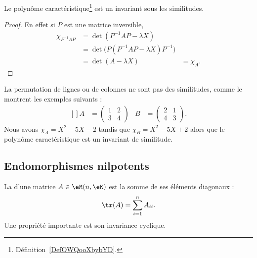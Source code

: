 \begin{lemma}
Le polynôme caractéristique\footnote{Définition~\ref{DefOWQooXbybYD}.} est un invariant sous les similitudes. 
\end{lemma}

\begin{proof}
En effet si \( P\) est une matrice inversible,
\begin{subequations}
    \begin{align}
        \chi_{P^{-1}AP} & = \det(P^{-1}AP-\lambda X)                     \\
                        & = \det\big( P(P^{-1}AP-\lambda X)P^{-1} \big)  \\
                        & = \det(A-\lambda X)
                        & = \chi_A.
    \end{align}
\end{subequations}
\end{proof}

La permutation de lignes ou de colonnes ne sont pas des similitudes, comme le montrent les exemples suivants :
\begin{equation}
    \begin{aligned}[]
        A&=\begin{pmatrix}
            1    &   2    \\
            3    &   4
        \end{pmatrix}&
        B&=\begin{pmatrix}
            2    &   1    \\
            4    &   3
        \end{pmatrix}.
    \end{aligned}
\end{equation}
Nous avons \( \chi_A=X^2-5X-2\) tandis que \( \chi_B=X^2-5X+2\) alors que le polynôme caractéristique est un invariant de similitude.

\subsection{Endomorphismes nilpotents}

La  d'une matrice \( A\in \eM(n,\eK)\) est la somme de ses éléments diagonaux :
\begin{equation}
    \tr(A)=\sum_{i=1}^nA_{ii}.
\end{equation}
Une propriété importante est son invariance cyclique.

